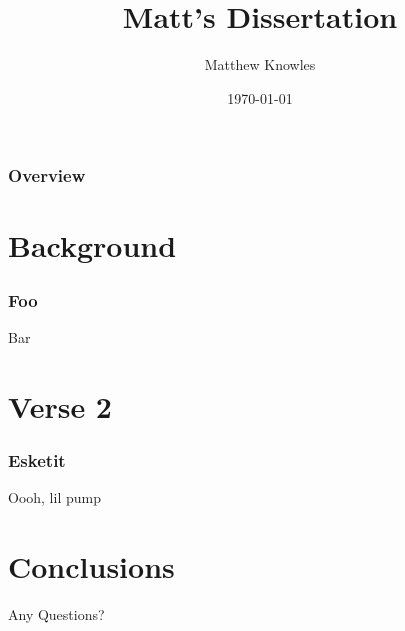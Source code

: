 \documentclass{beamer}
\title[Quick Mafs]{Matt's Dissertation}
\author{Matthew Knowles}
\institute[UoY] 
{
University of York \\ 
\medskip
\textit{mk1320@york.ac.uk} 
}
\date{\today}
\begin{document}
\begin{frame}
\titlepage 
\end{frame}

\begin{frame}
\frametitle{Overview} 
\tableofcontents 
\end{frame}

\section{Background}
\begin{frame}
\frametitle{Foo}
Bar
\end{frame}


\section{Verse 2}
\begin{frame}
\frametitle{Esketit}
Oooh, lil pump
\end{frame}

\section{Conclusions}
\begin{frame}
\Huge{\centerline{Any Questions?}}
\end{frame}
\end{document}
